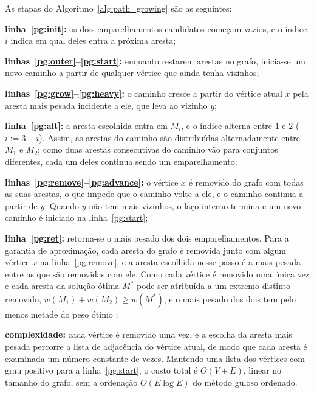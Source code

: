 As etapas do Algoritmo~\ref{alg:path_growing} são as seguintes:

\begin{alineas}
    \item \textbf{linha~\ref{pg:init}:} os dois emparelhamentos candidatos começam vazios, e o índice $i$ indica em qual deles entra a próxima aresta;
    \item \textbf{linhas~\ref{pg:outer}--\ref{pg:start}:} enquanto restarem arestas no grafo, inicia-se um novo caminho a partir de qualquer vértice que ainda tenha vizinhos;
    \item \textbf{linhas~\ref{pg:grow}--\ref{pg:heavy}:} o caminho cresce a partir do vértice atual $x$ pela aresta mais pesada incidente a ele, que leva ao vizinho $y$;
    \item \textbf{linha~\ref{pg:alt}:} a aresta escolhida entra em $M_i$, e o índice alterna entre $1$ e $2$ ($i := 3 - i$). Assim, as arestas do caminho são distribuídas alternadamente entre $M_1$ e $M_2$; como duas arestas consecutivas do caminho vão para conjuntos diferentes, cada um deles continua sendo um emparelhamento;
    \item \textbf{linhas~\ref{pg:remove}--\ref{pg:advance}:} o vértice $x$ é removido do grafo com todas as suas arestas, o que impede que o caminho volte a ele, e o caminho continua a partir de $y$. Quando $y$ não tem mais vizinhos, o laço interno termina e um novo caminho é iniciado na linha~\ref{pg:start};
    \item \textbf{linha~\ref{pg:ret}:} retorna-se o mais pesado dos dois emparelhamentos. Para a garantia de aproximação, cada aresta do grafo é removida junto com algum vértice $x$ na linha~\ref{pg:remove}, e a aresta escolhida nesse passo é a mais pesada entre as que são removidas com ele. Como cada vértice é removido uma única vez e cada aresta da solução ótima $M^*$ pode ser atribuída a um extremo distinto removido, $w(M_1) + w(M_2) \ge w(M^*)$, e o mais pesado dos dois tem pelo menos metade do peso ótimo \cite{drake};
    \item \textbf{complexidade:} cada vértice é removido uma vez, e a escolha da aresta mais pesada percorre a lista de adjacência do vértice atual, de modo que cada aresta é examinada um número constante de vezes. Mantendo uma lista dos vértices com grau positivo para a linha~\ref{pg:start}, o custo total é $O(V + E)$, linear no tamanho do grafo, sem a ordenação $O(E \log E)$ do método guloso ordenado.
\end{alineas}

